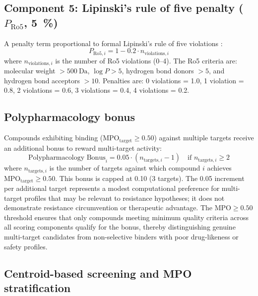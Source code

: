 \documentclass[journal=jcisd8,manuscript=suppinfo]{achemso}
\begin{document}
\subsection*{Component 5: Lipinski's rule of five penalty ($P_{\text{Ro5}}$, \qty{5}{\percent})}

A penalty term proportional to formal Lipinski's rule of five violations \cite{Lipinski2004}:
\begin{equation}
P_{\text{Ro5}, i} = 1 - 0.2 \cdot n_{\text{violations}, i}
\label{eq:ro5}
\end{equation}
where $n_{\text{violations}, i}$ is the number of Ro5 violations (\numrange{0}{4}). The Ro5 criteria are: molecular weight $> \qty{500}{\dalton}$, $\log P > \num{5}$, hydrogen bond donors $> \num{5}$, and hydrogen bond acceptors $> \num{10}$. Penalties are: \num{0} violations = \num{1.0}, \num{1} violation = \num{0.8}, \num{2} violations = \num{0.6}, \num{3} violations = \num{0.4}, \num{4} violations = \num{0.2}.

\subsection*{Polypharmacology bonus}

Compounds exhibiting binding ($\text{MPO}_{\text{target}} \geq \num{0.50}$) against multiple targets receive an additional bonus to reward multi-target activity:
\begin{equation}
\text{Polypharmacology Bonus}_i = 0.05 \cdot (n_{\text{targets}, i} - 1) \quad \text{if } n_{\text{targets}, i} \geq 2
\label{eq:poly_bonus}
\end{equation}
where $n_{\text{targets}, i}$ is the number of targets against which compound $i$ achieves $\text{MPO}_{\text{target}} \geq \num{0.50}$. This bonus is capped at \num{+0.10} (\num{3} targets). The \num{0.05} increment per additional target represents a modest computational preference for multi-target profiles that may be relevant to resistance hypotheses; it does not demonstrate resistance circumvention or therapeutic advantage. The $\text{MPO} \geq \num{0.50}$ threshold ensures that only compounds meeting minimum quality criteria across all scoring components qualify for the bonus, thereby distinguishing genuine multi-target candidates from non-selective binders with poor drug-likeness or safety profiles.

\subsection*{Centroid-based screening and MPO stratification}
\end{document}
